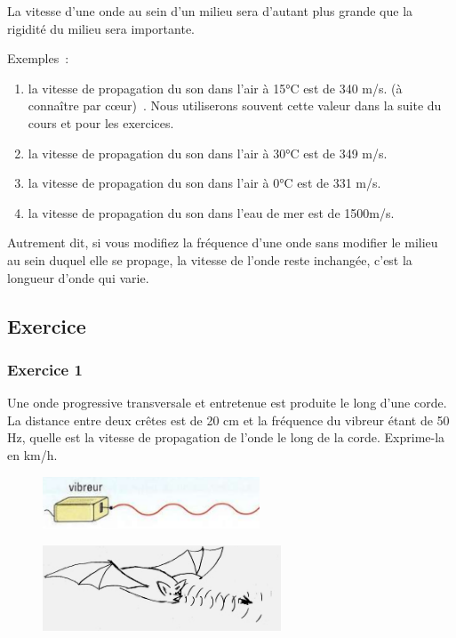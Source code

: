 La vitesse d'une onde au sein d'un milieu sera d'autant plus
grande que la rigidité du milieu sera importante.

Exemples~: 
\begin{enumerate}
\item  la vitesse de propagation du son dans l'air à 15°C est de 340 m/s. (à connaître par cœur)~. Nous utiliserons souvent cette valeur dans la suite du cours et
  pour les exercices.
\item  la vitesse de propagation du son dans l'air à 30°C est de 349 m/s.
\item  la vitesse de propagation du son dans l'air à 0°C est de 331 m/s.
\item  la vitesse de propagation du son dans l'eau de mer est de 1500m/s.
\end{enumerate}

Autrement dit, si vous modifiez la fréquence d'une onde sans modifier le
milieu au sein duquel elle se propage, la vitesse de l'onde reste
inchangée, c'est la longueur d'onde qui varie.

\subsection{Exercice}

\subsubsection*{Exercice 1}
  Une onde progressive transversale et entretenue est produite le long
  d'une corde. La distance entre deux crêtes est de 20 cm et la
  fréquence du vibreur étant de 50 Hz, quelle est la vitesse de
  propagation de l'onde le long de la corde. Exprime-la en km/h.
\begin{figure}
\centering
\includegraphics[width=6.468cm,height=1.552cm]{Pictures/10000001000001F900000079C23D6065BA9505A8.png}
\caption{}
\end{figure}

\begin{figure}
\centering
\includegraphics[width=7.103cm,height=2.54cm]{Pictures/10000001000001320000006DEEEFAD8D2B8AA8D8.png}
\caption{}
\end{figure}

